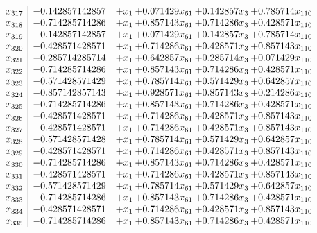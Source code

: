 \documentclass[11pt]{article}
\begin{document}
\[\begin{array}{c| c c@{\hskip 2pt} c@{\hskip 2pt} c@{\hskip 2pt} c@{\hskip 2pt} }
 x_{317}   &  -0.142857142857 & +  x_{1} & + 0.071429 x_{61} & + 0.142857 x_{3} & + 0.785714 x_{110}\\
 x_{318}   &  -0.714285714286 & +  x_{1} & + 0.857143 x_{61} & + 0.714286 x_{3} & + 0.428571 x_{110}\\
 x_{319}   &  -0.142857142857 & +  x_{1} & + 0.071429 x_{61} & + 0.142857 x_{3} & + 0.785714 x_{110}\\
 x_{320}   &  -0.428571428571 & +  x_{1} & + 0.714286 x_{61} & + 0.428571 x_{3} & + 0.857143 x_{110}\\
 x_{321}   &  -0.285714285714 & +  x_{1} & + 0.642857 x_{61} & + 0.285714 x_{3} & + 0.071429 x_{110}\\
 x_{322}   &  -0.714285714286 & +  x_{1} & + 0.857143 x_{61} & + 0.714286 x_{3} & + 0.428571 x_{110}\\
 x_{323}   &  -0.571428571429 & +  x_{1} & + 0.785714 x_{61} & + 0.571429 x_{3} & + 0.642857 x_{110}\\
 x_{324}   &  -0.857142857143 & +  x_{1} & + 0.928571 x_{61} & + 0.857143 x_{3} & + 0.214286 x_{110}\\
 x_{325}   &  -0.714285714286 & +  x_{1} & + 0.857143 x_{61} & + 0.714286 x_{3} & + 0.428571 x_{110}\\
 x_{326}   &  -0.428571428571 & +  x_{1} & + 0.714286 x_{61} & + 0.428571 x_{3} & + 0.857143 x_{110}\\
 x_{327}   &  -0.428571428571 & +  x_{1} & + 0.714286 x_{61} & + 0.428571 x_{3} & + 0.857143 x_{110}\\
 x_{328}   &  -0.571428571428 & +  x_{1} & + 0.785714 x_{61} & + 0.571429 x_{3} & + 0.642857 x_{110}\\
 x_{329}   &  -0.428571428571 & +  x_{1} & + 0.714286 x_{61} & + 0.428571 x_{3} & + 0.857143 x_{110}\\
 x_{330}   &  -0.714285714286 & +  x_{1} & + 0.857143 x_{61} & + 0.714286 x_{3} & + 0.428571 x_{110}\\
 x_{331}   &  -0.428571428571 & +  x_{1} & + 0.714286 x_{61} & + 0.428571 x_{3} & + 0.857143 x_{110}\\
 x_{332}   &  -0.571428571429 & +  x_{1} & + 0.785714 x_{61} & + 0.571429 x_{3} & + 0.642857 x_{110}\\
 x_{333}   &  -0.714285714286 & +  x_{1} & + 0.857143 x_{61} & + 0.714286 x_{3} & + 0.428571 x_{110}\\
 x_{334}   &  -0.428571428571 & +  x_{1} & + 0.714286 x_{61} & + 0.428571 x_{3} & + 0.857143 x_{110}\\
 x_{335}   &  -0.714285714286 & +  x_{1} & + 0.857143 x_{61} & + 0.714286 x_{3} & + 0.428571 x_{110}\\

\end{array}\]
\end{document}
